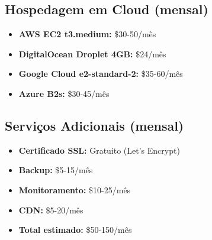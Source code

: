 \documentclass[12pt,a4paper]{article}
\begin{document}
\subsection{Hospedagem em Cloud (mensal)}
\begin{itemize}
    \item \textbf{AWS EC2 t3.medium:} \$30-50/mês
    \item \textbf{DigitalOcean Droplet 4GB:} \$24/mês
    \item \textbf{Google Cloud e2-standard-2:} \$35-60/mês
    \item \textbf{Azure B2s:} \$30-45/mês
\end{itemize}

\subsection{Serviços Adicionais (mensal)}
\begin{itemize}
    \item \textbf{Certificado SSL:} Gratuito (Let's Encrypt)
    \item \textbf{Backup:} \$5-15/mês
    \item \textbf{Monitoramento:} \$10-25/mês
    \item \textbf{CDN:} \$5-20/mês
    \item \textbf{Total estimado:} \$50-150/mês
\end{itemize}
\end{document}
